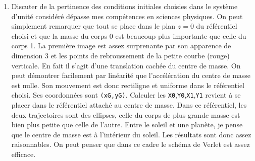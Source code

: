 \begin{enumerate}
  \item Discuter de la pertinence des conditions initiales choisies dans le système d'unité considéré dépasse mes compétences en sciences physiques. On peut simplement remarquer que tout se place dans le plan $z=0$ du référentiel choisi et que la masse du corps 0 est beaucoup plus importante que celle du corps 1.\newline
  La première image est assez surprenante par son apparence de dimension 3 et les points de rebroussement de la petite courbe (rouge) verticale. En fait il s'agit d'une translation cachée du centre de masse.\newline
  On peut démontrer facilement par linéarité que l'accélération du centre de masse est nulle. Son mouvement est donc rectiligne et uniforme dans le référentiel choisi. Ses coordonnées sont \texttt{(xG,yG)}.\newline
  Calculer les \texttt{X0},\texttt{Y0},\texttt{X1},\texttt{Y1} revient à se placer dans le référentiel attaché au centre de masse. Dans ce référentiel, les deux trajectoires sont des ellipses, celle du corps de plus grande masse est bien plus petite que celle de l'autre. Entre le soleil et une planète, je pense que le centre de masse est à l'intérieur du soleil.\newline
  Les résultats sont donc assez raisonnables. On peut penser que dans ce cadre le schéma de Verlet est assez efficace.
\end{enumerate}
